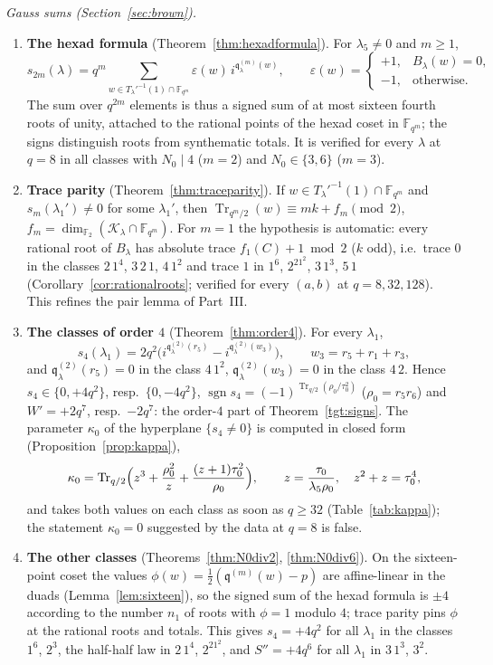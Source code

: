 \documentclass[12pt,a4paper]{amsart}
\theoremstyle{definition}
\newcommand{\F}{\mathbb{F}}
\newcommand{\Tr}{\operatorname{Tr}}
\newcommand{\sgn}{\operatorname{sgn}}
\newcommand{\eps}{\varepsilon}
\newcommand{\Kk}{\mathcal{K}}
\newcommand{\qq}{\mathfrak{q}}
\newcommand{\Spp}{S''}
\begin{document}
\emph{Gauss sums (Section~\ref{sec:brown}).}
\begin{enumerate}[label=(\roman*),leftmargin=2em]
\item \textbf{The hexad formula} (Theorem~\ref{thm:hexadformula}). For $\lambda_5\ne0$ and $m\ge1$,
\[
s_{2m}(\lambda)=q^m\sum_{w\in T_\lambda'^{-1}(1)\cap\F_{q^m}}\eps(w)\,i^{\qq^{(m)}_\lambda(w)},\qquad \eps(w)=\begin{cases}+1,& B_\lambda(w)=0,\\-1,&\text{otherwise}.\end{cases}
\]
The sum over $q^{2m}$ elements is thus a signed sum of at most sixteen fourth roots of unity, attached to the rational points of the hexad coset in $\F_{q^m}$; the signs distinguish roots from synthematic totals. It is verified for every $\lambda$ at $q=8$ in all classes with $N_0\mid4$ ($m=2$) and $N_0\in\{3,6\}$ ($m=3$).
\item \textbf{Trace parity} (Theorem~\ref{thm:traceparity}). If $w\in T_\lambda'^{-1}(1)\cap\F_{q^m}$ and $s_m(\lambda_1')\ne0$ for some $\lambda_1'$, then $\Tr_{q^m/2}(w)\equiv mk+f_m\pmod 2$, $f_m=\dim_{\F_2}(\Kk_\lambda\cap\F_{q^m})$. For $m=1$ the hypothesis is automatic: every rational root of $B_\lambda$ has absolute trace $f_1(C)+1\bmod2$ ($k$ odd), i.e.\ trace $0$ in the classes $2\,1^4$, $3\,2\,1$, $4\,1^2$ and trace $1$ in $1^6$, $2^21^2$, $3\,1^3$, $5\,1$ (Corollary~\ref{cor:rationalroots}; verified for every $(a,b)$ at $q=8,32,128$). This refines the pair lemma of Part~III.
\item \textbf{The classes of order $4$} (Theorem~\ref{thm:order4}). For every $\lambda_1$,
\[
s_4(\lambda_1)=2q^2\bigl(i^{\qq^{(2)}_\lambda(r_5)}-i^{\qq^{(2)}_\lambda(w_3)}\bigr),\qquad w_3=r_5+r_1+r_3,
\]
and $\qq^{(2)}_\lambda(r_5)=0$ in the class $4\,1^2$, $\qq^{(2)}_\lambda(w_3)=0$ in the class $4\,2$. Hence $s_4\in\{0,+4q^2\}$, resp.\ $\{0,-4q^2\}$, $\sgn s_4=(-1)^{\Tr_{q/2}(\rho_0/\tau_0^2)}$ ($\rho_0=r_5r_6$) and $W'=+2q^7$, resp.\ $-2q^7$: the order-$4$ part of Theorem~\ref{tgt:signs}. The parameter $\kappa_0$ of the hyperplane $\{s_4\ne0\}$ is computed in closed form (Proposition~\ref{prop:kappa}),
\[
\kappa_0=\Tr_{q/2}\Bigl(z^3+\frac{\rho_0^2}{z}+\frac{(z+1)\tau_0^2}{\rho_0}\Bigr),\qquad z=\frac{\tau_0}{\lambda_5\rho_0},\quad z^2+z=\tau_0^4 ,
\]
and takes both values on each class as soon as $q\ge32$ (Table~\ref{tab:kappa}); the statement $\kappa_0=0$ suggested by the data at $q=8$ is false.
\item \textbf{The other classes} (Theorems~\ref{thm:N0div2}, \ref{thm:N0div6}). On the sixteen-point coset the values $\phi(w)=\frac12(\qq^{(m)}(w)-p)$ are affine-linear in the duads (Lemma~\ref{lem:sixteen}), so the signed sum of the hexad formula is $\pm4$ according to the number $n_1$ of roots with $\phi=1$ modulo $4$; trace parity pins $\phi$ at the rational roots and totals. This gives $s_4=+4q^2$ for all $\lambda_1$ in the classes $1^6$, $2^3$, the half-half law in $2\,1^4$, $2^21^2$, and $\Spp=+4q^6$ for all $\lambda_1$ in $3\,1^3$, $3^2$.

\end{enumerate}
\end{document}
